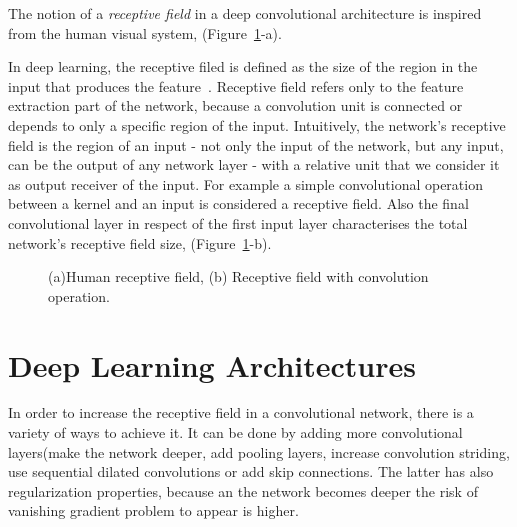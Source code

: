 The notion of a \textit{receptive field} in a deep convolutional architecture is inspired from the human visual system, (Figure~\ref{c3:fig_receptive_field}-a).

In deep learning, the receptive filed is defined as the size of the region in the input that produces the feature~\cite{araujo2019computing}. Receptive field refers only to the feature extraction part of the network, because a convolution unit is connected or depends to only a specific region of the input.
Intuitively, the network's receptive field is the region of an input - not only the input of the network, but any input, can be the output of any network layer - with a relative unit that we consider it as output receiver of the input. For example a simple convolutional operation between a kernel and an input is considered a receptive field. Also the final convolutional layer in respect of the first input layer characterises the total network's receptive field size, (Figure~\ref{c3:fig_receptive_field}-b).

\begin{figure}[h!]
    \centering  
    \caption{(a)Human receptive field, (b) Receptive field with convolution operation.}
    \label{c3:fig_receptive_field}
\end{figure}

\section{Deep Learning Architectures}
\label{c3:deep_arch}

In order to increase the receptive field in a convolutional network, there is a variety of ways to achieve it. It can be done by adding more convolutional layers(make the network deeper, add pooling layers, increase convolution striding, use sequential dilated convolutions or add skip connections.
The latter has also regularization properties, because an the network becomes deeper the risk of vanishing gradient problem to appear is higher.

